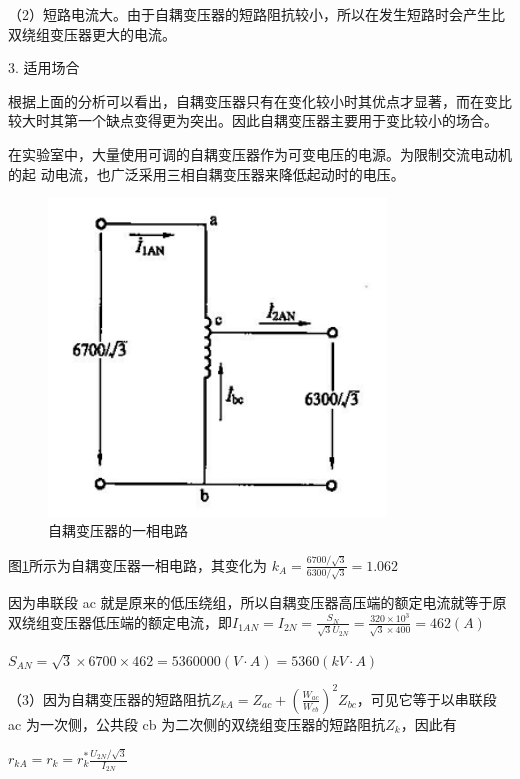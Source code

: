 \documentclass{book}
\begin{document}
（2）短路电流大。由于自耦变压器的短路阻抗较小，所以在发生短路时会产生比双绕组变压器更大的电流。

3. 适用场合

根据上面的分析可以看出，自耦变压器只有在变化较小时其优点才显著，而在变比较大时其第一个缺点变得更为突出。因此自耦变压器主要用于变比较小的场合。

在实验室中，大量使用可调的自耦变压器作为可变电压的电源。为限制交流电动机的起 动电流，也广泛采用三相自耦变压器来降低起动时的电压。

\begin{figure}[H]
	\centering
	\includegraphics[width=0.80\textwidth]{5-6.png}
	\caption{自耦变压器的一相电路}
	\label{fig_5-6}
\end{figure}

图\ref{fig_5-6}所示为自耦变压器一相电路，其变化为
${{k}_{A}}=\frac{6700/\sqrt{3}}{6300/\sqrt{3}}=1.062$

因为串联段 ac 就是原来的低压绕组，所以自耦变压器高压端的额定电流就等于原双绕组变压器低压端的额定电流，即${{I}_{1AN}}={{I}_{2N}}=\frac{{{S}_{N}}}{\sqrt{3}{{U}_{2N}}}=\frac{320\times {{10}^{3}}}{\sqrt{3}\times 400}=462\left( A \right)$ 

${{S}_{AN}}=\sqrt{3}\times 6700\times 462=5360000\left( V\cdot A \right)=5360\left( kV\cdot A \right)$ 

（3）因为自耦变压器的短路阻抗${{Z}_{kA}}={{Z}_{ac}}+{{\left( \frac{{{W}_{ac}}}{{{W}_{cb}}} \right)}^{2}}{{Z}_{bc}}$，可见它等于以串联段 ac 为一次侧，公共段 cb 为二次侧的双绕组变压器的短路阻抗${{Z}_{k}}$，因此有

${{r}_{kA}}={{r}_{k}}=r_{k}^{*}\frac{{{U}_{2N}}/\sqrt{3}}{{{I}_{2N}}}$
\end{document}
